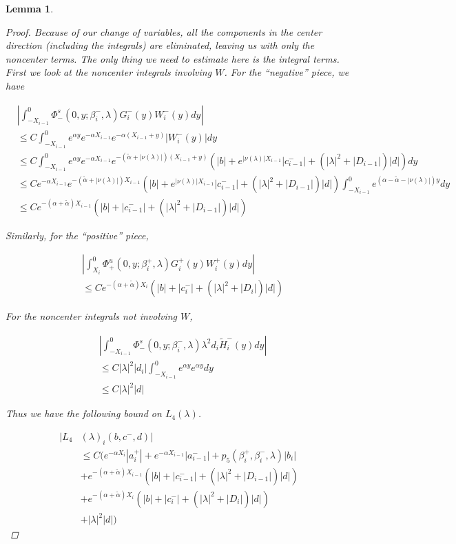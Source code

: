 \documentclass[12pt]{article}
\newtheorem{lemma}{Lemma}
\begin{document}
\begin{lemma}
\begin{proof}
Because of our change of variables, all the components in the center direction (including the integrals) are eliminated, leaving us with only the noncenter terms. The only thing we need to estimate here is the integral terms. First we look at the noncenter integrals involving $W$. For the ``negative'' piece, we have

\begin{align*}
&\left| \int_{-X_{i-1}}^0 \Phi^s_-(0, y; \beta_i^-, \lambda) G_i^-(y)W_i^-(y) dy \right| \\
&\leq C \int_{-X_{i-1}}^0 e^{\alpha y} e^{-\alpha X_{i-1}} e^{-\alpha(X_{i-1} + y)} |W_i^-(y)| dy \\
&\leq C \int_{-X_{i-1}}^0 e^{\alpha y} e^{-\alpha X_{i-1}} e^{-(\tilde{\alpha} + |\nu(\lambda)|)(X_{i-1} + y)} ( |b| + e^{|\nu(\lambda)|X_{i-1}}|c_{i-1}^-| + (|\lambda|^2 + |D_{i-1}|)|d| ) dy \\
&\leq C e^{-\alpha X_{i-1} } e^{-(\tilde{\alpha} + |\nu(\lambda)|) X_{i-1}}( |b| + e^{|\nu(\lambda)|X_{i-1}}|c_{i-1}^-| + (|\lambda|^2 + |D_{i-1}|)|d| ) \int_{-X_{i-1}}^0 e^{(\alpha - \tilde{\alpha} - |\nu(\lambda)|)y} dy \\
&\leq C e^{-(\alpha + \tilde{\alpha}) X_{i-1}}( |b| + |c_{i-1}^-| + (|\lambda|^2 + |D_{i-1}|)|d| )
\end{align*}

Similarly, for the ``positive'' piece,

\begin{align*}
&\left| \int_{X_i}^0 \Phi^u_+(0, y; \beta_i^+, \lambda) G_i^+(y)W_i^+(y) dy \right| \\
&\leq C e^{-(\alpha + \tilde{\alpha}) X_i}( |b| + |c_i^-| + (|\lambda|^2 + |D_i|)|d| )
\end{align*}

For the noncenter integrals not involving $W$,

\begin{align*}
&\left| \int_{-X_{i-1}}^0
\Phi^s_-(0, y; \beta_i^-, \lambda) \lambda^2 d_i \tilde{H}_i^-(y) dy \right| \\
&\leq C |\lambda|^2 |d_i| \int_{-X_{i-1}}^0 e^{\alpha y} e^{\alpha y} dy \\
&\leq C |\lambda|^2 |d| 
\end{align*}

Thus we have the following bound on $L_4(\lambda)$. 

\begin{align*}
|L_4&(\lambda)_i(b, c^-, d)|\\ 
&\leq C \Big( e^{-\alpha X_i} |a_i^+| +  e^{-\alpha X_{i-1}} |a_{i-1}^-| + p_5(\beta_i^+, \beta_i^-, \lambda) |b_i| \\
&+ e^{-(\alpha + \tilde{\alpha}) X_{i-1}}( |b| + |c_{i-1}^-| + (|\lambda|^2 + |D_{i-1}|)|d| ) \\
&+ e^{-(\alpha + \tilde{\alpha}) X_i}( |b| + |c_i^-| + (|\lambda|^2 + |D_i|)|d| ) \\
&+ |\lambda|^2 |d|  \Big)
\end{align*}


\end{proof}
\end{lemma}
\end{document}
